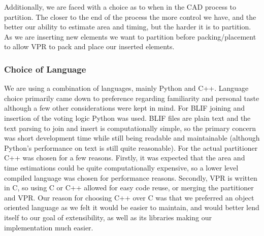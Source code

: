 \documentclass[12pt,final,oneside]{memoir} %
\begin{document}
Additionally, we are faced with a choice as to when in the \ac{CAD} process to partition. The closer to the end of the process the more control we have, and the better our ability to estimate area and timing, but the harder it is to partition. As we are inserting new elements we want to partition before packing/placement to allow \ac{VPR} to pack and place our inserted elements.

\subsubsection{Choice of Language}
We are using a combination of languages, mainly Python and C++. Language choice primarily came down to preference regarding familiarity and personal taste although a few other considerations were kept in mind.
For \ac{BLIF} joining and insertion of the voting logic Python was used. \ac{BLIF} files are plain text and the text parsing to join and insert is computationally simple, so the primary concern was short development time while still being readable and maintainable (although Python's performance on text is still quite reasonable)\cite{LanguageBenchmark}.
For the actual partitioner C++ was chosen for a few reasons. Firstly, it was expected that the area and time estimations could be quite computationally expensive, so a lower level compiled language was chosen for performance reasons\cite{LanguageBenchmark}. Secondly, \ac{VPR} is written in C, so using C or C++ allowed for easy code reuse, or merging the partitioner and \ac{VPR}. Our reason for choosing C++ over C was that we preferred an object oriented language as we felt it would be easier to maintain, and would better lend itself to our goal of extensibility, as well as its libraries making our implementation much easier.
\end{document}
